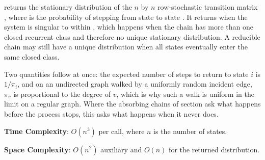 \begin{compactitem}
  \item {} returns the stationary distribution of the $n$ by $n$ row-stochastic transition matrix , where  is the probability of stepping from state  to state . It returns  when the system is singular to within , which happens when the chain has more than one closed recurrent class and therefore no unique stationary distribution. A reducible chain may still have a unique distribution when all states eventually enter the same closed class.
\end{compactitem}

Two quantities follow at once: the expected number of steps to return to state $i$ is $1/\pi_i$, and on an undirected graph walked by a uniformly random incident edge, $\pi_v$ is proportional to the degree of $v$, which is why such a walk is uniform in the limit on a regular graph. Where the absorbing chains of section  ask what happens before the process stops, this asks what happens when it never does.

\textbf{Time Complexity}: $O(n^{3})$ per call, where $n$ is the number of states.

\textbf{Space Complexity}: $O(n^{2})$ auxiliary and $O(n)$ for the returned distribution.

